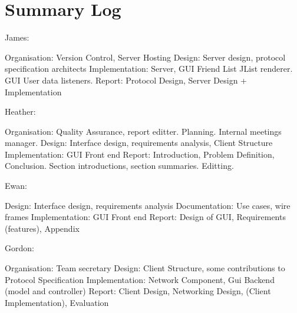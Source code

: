 \section{Summary Log}
\label{sumlog}

James:

Organisation: Version Control, Server Hosting
Design: Server design, protocol specification architects
Implementation: Server, GUI Friend List JList renderer. GUI User data listeners.
Report: Protocol Design, Server Design + Implementation

Heather:

Organisation: Quality Assurance, report editter. Planning. Internal meetings manager.
Design: Interface design, requirements analysis, Client Structure
Implementation: GUI Front end
Report: Introduction, Problem Definition, Conclusion. Section introductions, section summaries. Editting. 


Ewan:

Design: Interface design, requirements analysis
Documentation: Use cases, wire frames
Implementation: GUI Front end
Report: Design of GUI, Requirements (features), Appendix 

Gordon:

Organisation: Team secretary
Design: Client Structure, some contributions to Protocol Specification 
Implementation: Network Component, Gui Backend (model and controller)
Report: Client Design, Networking Design, (Client Implementation), Evaluation
